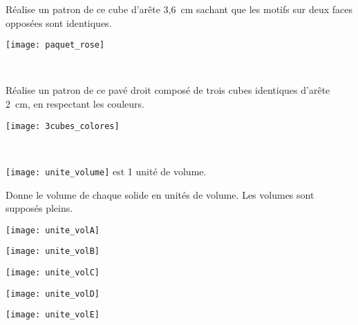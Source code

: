 \begin{exercice}
\begin{minipage}[c]{0.66\linewidth}
\vspace{1cm}
Réalise un patron de ce cube d'arête 3,6 cm sachant que les motifs sur deux faces opposées sont identiques.
 \end{minipage} \hfill%
 \begin{minipage}[c]{0.28\linewidth}
\vspace{1cm}
  \texttt{[image: paquet\_rose]}
  \end{minipage} \\
\end{exercice}


\begin{exercice}
\begin{minipage}[c]{0.46\linewidth}
\vspace{1.9cm}
Réalise un patron de ce pavé droit composé de trois cubes identiques d'arête 2 cm, en respectant les couleurs.
 \end{minipage} \hfill%
 \begin{minipage}[c]{0.46\linewidth}
 \vspace{1cm}
  \texttt{[image: 3cubes\_colores]}
  \end{minipage} \\
\end{exercice}



\begin{exercice}
\texttt{[image: unite\_volume]} est 1 unité de volume.

 Donne le volume de chaque solide en unités de volume. Les volumes sont supposés pleins.
\begin{colenumerate}{2}
 \item
 
 \texttt{[image: unite\_volA]} 
 
 \item
 
 \texttt{[image: unite\_volB]} 
 
 \item
 
 \texttt{[image: unite\_volC]} 
 
 \item
 
 \texttt{[image: unite\_volD]} 
 
 \item
 
 \texttt{[image: unite\_volE]} 
 \end{colenumerate}
\end{exercice}


